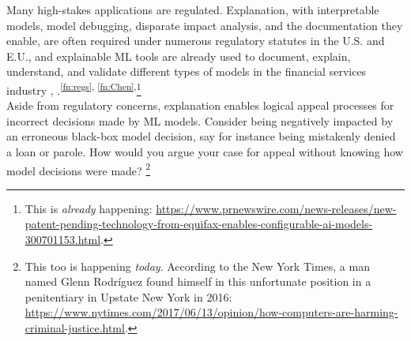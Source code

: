 \documentclass[sigconf]{acmart}
\begin{document}
Many high-stakes applications are regulated. Explanation, with interpretable models, model debugging, disparate impact analysis, and the documentation they enable, are often required under numerous regulatory statutes in the U.S. and E.U., and explainable ML tools are already used to document, explain, understand, and validate different types of models in the financial services industry \cite{lime-sup}, \cite{wf_xnn}.\textsuperscript{\ref{fn:regs}, \ref{fn:Chen},}\footnote{\scriptsize{This is \textit{already} happening: \url{https://www.prnewswire.com/news-releases/new-patent-pending-technology-from-equifax-enables-configurable-ai-models-300701153.html}.}}\\

\vspace{-8pt}
\noindent Aside from regulatory concerns, explanation enables logical appeal processes for incorrect decisions made by ML models. Consider being negatively impacted by an erroneous black-box model decision, say for instance being mistakenly denied a loan or parole. How would you argue your case for appeal without knowing how model decisions were made? \footnote{This too is happening \textit{today}. According to the New York Times, a man named Glenn Rodr\'iguez found himself in this unfortunate position in a penitentiary in Upstate New York in 2016: \url{https://www.nytimes.com/2017/06/13/opinion/how-computers-are-harming-criminal-justice.html}.}
\end{document}
